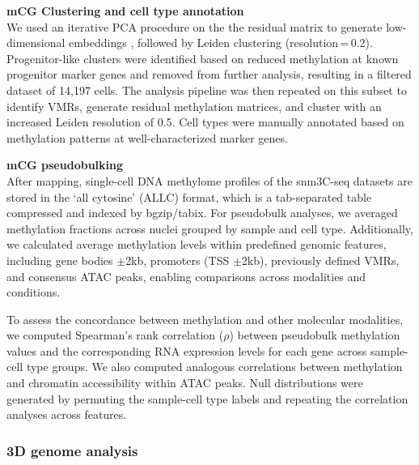 \noindent
\textbf{mCG Clustering and cell type annotation} \\
We used an iterative PCA procedure on the the residual matrix to generate low-dimensional embeddings \cite{Kremer2024-pd}, followed by Leiden clustering (resolution\,=\,0.2). Progenitor-like clusters were identified based on reduced methylation at known progenitor marker genes and removed from further analysis, resulting in a filtered dataset of 14{,}197 cells. The analysis pipeline was then repeated on this subset to identify VMRs, generate residual methylation matrices, and cluster with an increased Leiden resolution of 0.5. Cell types were manually annotated based on methylation patterns at well-characterized marker genes.

\noindent
\textbf{mCG pseudobulking} \\
After mapping, single-cell DNA methylome profiles of the snm3C-seq datasets are stored in the `all cytosine' (ALLC) format, which is a tab-separated table compressed and indexed by bgzip/tabix. For pseudobulk analyses, we averaged methylation fractions across nuclei grouped by sample and cell type. Additionally, we calculated average methylation levels within predefined genomic features, including gene bodies $\pm$2kb, promoters (TSS $\pm$2kb), previously defined VMRs, and consensus ATAC peaks, enabling comparisons across modalities and conditions.

To assess the concordance between methylation and other molecular modalities, we computed Spearman’s rank correlation ($\rho$) between pseudobulk methylation values and the corresponding RNA expression levels for each gene across sample-cell type groups. We also computed analogous correlations between methylation and chromatin accessibility within ATAC peaks. Null distributions were generated by permuting the sample-cell type labels and repeating the correlation analyses across features.

\subsubsection{3D genome analysis}

